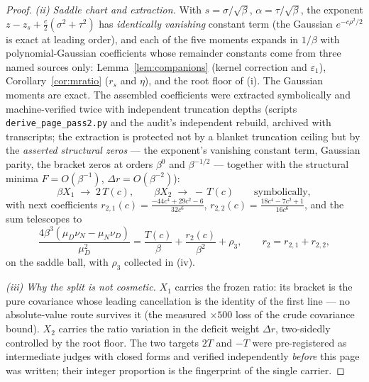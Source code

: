 \documentclass[11pt]{article}
\theoremstyle{remark}
\begin{document}
\begin{proof}
\emph{(ii) Saddle chart and extraction.} With
$s=\sigma/\sqrt\beta$, $\alpha=\tau/\sqrt\beta$, the exponent
$z-z_s+\tfrac c2(\sigma^2+\tau^2)$ has \emph{identically vanishing}
constant term (the Gaussian $e^{-c\rho^2/2}$ is exact at leading
order), and each of the five moments expands in $1/\beta$ with
polynomial-Gaussian coefficients whose remainder constants come
from three named sources only: Lemma~\ref{lem:companions}
\textup{(}kernel correction and $\varepsilon_1$\textup{)},
Corollary~\ref{cor:mratio} \textup{(}$r_s$ and $\eta$\textup{)},
and the root floor of \textup{(i)}. The Gaussian moments are exact.
The assembled coefficients were extracted symbolically and
machine-verified twice with independent truncation depths
\textup{(}scripts \texttt{derive\_page\_pass2.py} and the audit's
independent rebuild, archived with transcripts; the extraction is
protected not by a blanket truncation ceiling but by the
\emph{asserted structural zeros} --- the exponent's vanishing
constant term, Gaussian parity, the bracket zeros at orders
$\beta^{0}$ and $\beta^{-1/2}$ --- together with the structural
minima $F=O(\beta^{-1})$, $\Delta r=O(\beta^{-2})$\textup{)}:
\[
\beta X_1\;\longrightarrow\;2\,T(c),\qquad
\beta X_2\;\longrightarrow\;-\,T(c)\qquad
\text{symbolically},
\]
with next coefficients
$r_{2,1}(c)=\frac{-44c^4+29c^2-6}{32c^6}$,
$r_{2,2}(c)=\frac{18c^4-7c^2+1}{16c^6}$, and the sum telescopes to
\[
\frac{4\beta^3(\mu_D\nu_N-\mu_N\nu_D)}{\mu_D^2}
=\frac{T(c)}{\beta}+\frac{r_2(c)}{\beta^2}+\rho_3,
\qquad r_2=r_{2,1}+r_{2,2},
\]
on the saddle ball, with $\rho_3$ collected in \textup{(iv)}.

\emph{(iii) Why the split is not cosmetic.} $X_1$ carries the
frozen ratio: its bracket is the pure covariance whose leading
cancellation is the identity of the first line --- no
absolute-value route survives it \textup{(}the measured
$\times500$ loss of the crude covariance bound\textup{)}. $X_2$
carries the ratio variation in the deficit weight $\Delta r$,
two-sidedly controlled by the root floor. The two targets $2T$ and
$-T$ were pre-registered as intermediate judges with closed forms
and verified independently \emph{before} this page was written;
their integer proportion is the fingerprint of the single carrier.


\end{proof}
\end{document}
